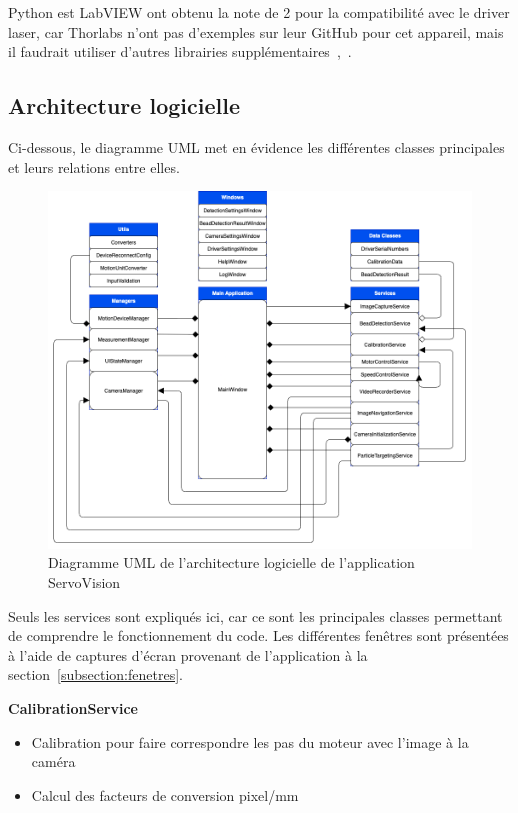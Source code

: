 Python est LabVIEW ont obtenu la note de 2 pour la compatibilité avec le driver laser, car Thorlabs n'ont pas d'exemples sur leur GitHub pour cet appareil, mais il faudrait utiliser d'autres librairies supplémentaires~\cite{controlLaserDriverPython},~\cite{controlLaserDriverLabVIEW}.

\newpage
\subsection{Architecture logicielle}
Ci-dessous, le diagramme UML met en évidence les différentes classes principales et leurs relations entre elles.
\begin{figure}[H]
    \centering
    \includegraphics[width=\textwidth]{assets/figures/Application_ServoVision/ServoVision_UML_Diagram.drawio.png}
    \caption{Diagramme UML de l'architecture logicielle de l'application ServoVision}
    \label{uml_servovision}
\end{figure}

Seuls les services sont expliqués ici, car ce sont les principales classes permettant de comprendre le fonctionnement du code. Les différentes fenêtres sont présentées à l'aide de captures d'écran provenant de l'application à la section~\ref{subsection:fenetres}.

\textbf{CalibrationService}
\begin{itemize}[label=\textbullet]
    \item Calibration pour faire correspondre les pas du moteur avec l'image à la caméra
    \item Calcul des facteurs de conversion pixel/mm
\end{itemize}

